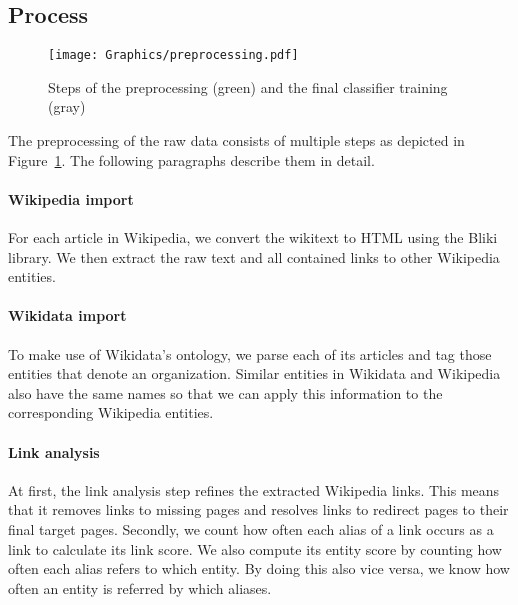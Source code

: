\subsection{Process}
\begin{figure}[ht]
	\centering
  \texttt{[image: Graphics/preprocessing.pdf]}
	\caption{Steps of the preprocessing (green) and the final classifier training (gray)}
	\label{fig:preprocessing}
\end{figure}

The preprocessing of the raw data consists of multiple steps as depicted in Figure~\ref{fig:preprocessing}. The following paragraphs describe them in detail.


\paragraph{Wikipedia import}
For each article in Wikipedia, we convert the wikitext to HTML using the Bliki library\footnotemark{}. We then extract the raw text and all contained links to other Wikipedia entities.


\paragraph{Wikidata import}
To make use of Wikidata's ontology, we parse each of its articles and tag those entities that denote an organization. Similar entities in Wikidata and Wikipedia also have the same names so that we can apply this information to the corresponding Wikipedia entities.


\paragraph{Link analysis}
At first, the link analysis step refines the extracted Wikipedia links. This means that it removes links to missing pages and resolves links to redirect pages to their final target pages. Secondly, we count how often each alias of a link occurs as a link to calculate its link score. We also compute its entity score by counting how often each alias refers to which entity. By doing this also vice versa, we know how often an entity is referred by which aliases.


